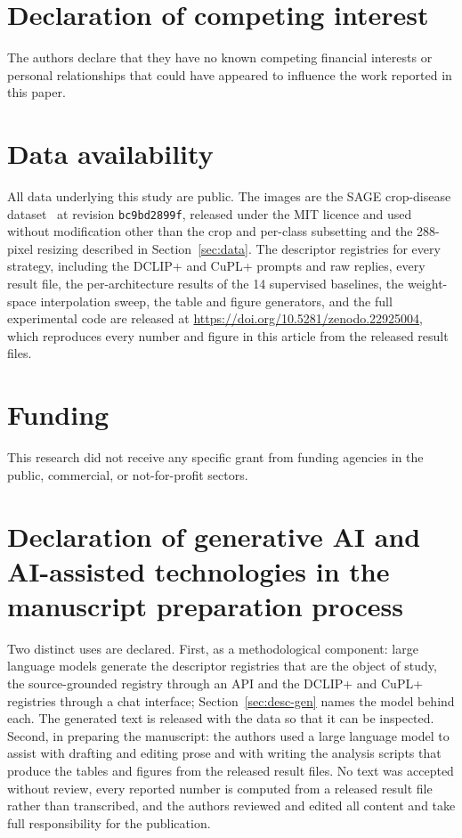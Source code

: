 \documentclass[a4paper,fleqn]{cas-dc}
\begin{document}
\printcredits

\section*{Declaration of competing interest}
The authors declare that they have no known competing financial interests or personal relationships
that could have appeared to influence the work reported in this paper.

\section*{Data availability}
All data underlying this study are public. The images are the SAGE crop-disease
dataset~\citep{sagedata2026} at revision \texttt{bc9bd2899f}, released under the MIT licence and
used without modification other than the crop and per-class subsetting and the 288-pixel resizing
described in Section~\ref{sec:data}. The descriptor registries for every strategy, including the
DCLIP+ and CuPL+ prompts and raw replies, every result file, the per-architecture results of the
14 supervised baselines, the weight-space interpolation sweep, the table and figure generators,
and the
full experimental code are released at \url{https://doi.org/10.5281/zenodo.22925004}, which reproduces
every number and figure in this article from the released result files.

\section*{Funding}
This research did not receive any specific grant from funding agencies in the public, commercial, or
not-for-profit sectors.

\section*{Declaration of generative AI and AI-assisted technologies in the manuscript preparation
process}
Two distinct uses are declared. First, as a methodological component: large language models generate
the descriptor registries that are the object of study, the source-grounded registry through an API
and the DCLIP+ and CuPL+ registries through a chat interface; Section~\ref{sec:desc-gen} names
the model behind each. The generated
text is released with the data so that it can be inspected. Second, in preparing the manuscript: the
authors used a large language model to assist with drafting and editing prose and with writing the
analysis scripts that produce the tables and figures from the released result files. No text was
accepted without review, every reported number is computed from a released result file rather than
transcribed, and the authors reviewed and edited all content and take full responsibility for the
publication.



\end{document}

